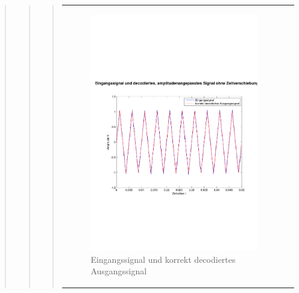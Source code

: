 \begin{quote}
\begin{quote}
\begin{quote}
\begin{center}
\begin{tabular}{ll}
                    \begin{minipage}{0.6\textwidth}
                        \begin{figure}[H]
                            \includegraphics[scale=0.4, trim = 0.8cm 7cm 0.8cm
                            8.5cm, clip]
                            {./Bilder/drei100_Eingang_vs_korrektDecodiert}
                              \caption{Eingangssignal und korrekt decodiertes
                              Ausgangssignal}
                        \end{figure}
                    \end{minipage}
                
                \end{tabular}
            \end{center}
            
            
            

\end{quote}
\end{quote}
\end{quote}
